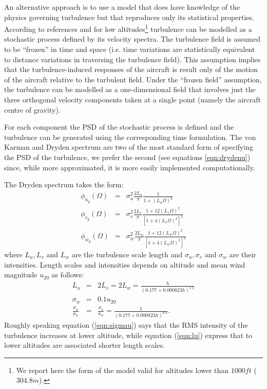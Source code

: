 \documentclass[a4paper,11pt]{report}
\begin{document}
An alternative approach is to use a model that does have knowledge of the physics governing turbulence but that reproduces only its statistical properties.
According to references \cite{milf8785c} and \cite{gage2003creating} for low altitudes\footnote{We report here the form of the model valid for altitudes lower than $1000ft$ ($304.8m$).} turbulence can be modelled as a stochastic process defined by its velocity spectra. The turbulence field is assumed to be ``frozen'' in time and space (i.e. time variations are statistically equivalent to distance variations in traversing the turbulence field). This assumption implies that the turbulence-induced responses of the aircraft is result only of the motion of the aircraft relative to the turbulent field.
Under the ``frozen field'' assumption, the turbulence can be modelled as a one-dimensional field that involves just the three orthogonal velocity components taken at a single point (namely the aircraft centre of gravity). 

For each component the PSD of the stochastic process is defined and the turbulence can be generated using the corresponding time formulation.
The von Karman and Dryden spectrum are two of the most standard form of specifying the PSD of the turbulence, we prefer the second (see equations \ref{eqn:drydenu}) since, while more approximated, it is more easily implemented computationally.

The Dryden spectrum takes the form:
\begin{eqnarray}
\phi_{u_g}(\Omega) & = & \sigma^2_u \frac{2L_u}{\pi} \frac{1}{1+(L_u\Omega)^2}\label{eqn:drydenu}\\ 
\phi_{v_g}(\Omega) & = & \sigma^2_v \frac{2L_v}{\pi} \frac{1+12(L_v\Omega)^2}{\left[1+4(L_v\Omega)^2\right]^2}\\ 
\phi_{w_g}(\Omega) & = & \sigma^2_w \frac{2L_w}{\pi} \frac{1+12(L_w\Omega)^2}{\left[1+4(L_w\Omega)^2\right]^2}\label{eqn:drydenw}
\end{eqnarray}
where $L_u,L_v$ and $L_w$ are the turbulence scale length and $\sigma_u,\sigma_v$ and $\sigma_w$ are their intensities.
Length scales and intensities depends on altitude and mean wind magnitude $u_{20}$ as follows:
\begin{eqnarray}
L_u &=& 2L_v = 2L_w = \frac{h}{(0.177+0.000823 h)^{1.2}}\label{eqn:lu}\\
\sigma_w&=&0.1u_{20} \\
\frac{\sigma_u}{\sigma_w}&=&\frac{\sigma_u}{\sigma_w}=\frac{1}{(0.177+0.000823 h)^{0.4}}\label{eqn:sigmau}.
\end{eqnarray}
Roughly speaking equation (\ref{eqn:sigmau}) says that the RMS intensity of the turbulence increases at lower altitude, while equation (\ref{eqn:lu}) express that to lower altitudes are associated shorter length scales.
\end{document}
